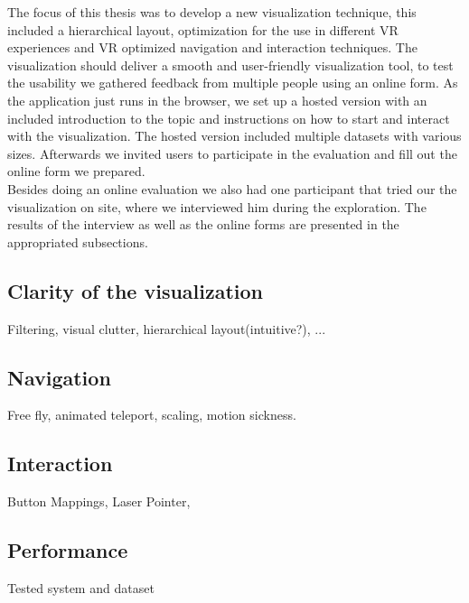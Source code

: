 The focus of this thesis was to develop a new visualization technique, this included a hierarchical layout, optimization for the use in different VR experiences and VR optimized navigation and interaction techniques.
The visualization should deliver a smooth and user-friendly visualization tool, to test the usability we gathered feedback from multiple people using an online form.
As the application just runs in the browser, we set up a hosted version \cite{thesisWebsite} with an included introduction to the topic and instructions on how to start and interact with the visualization. The hosted version included multiple datasets with various sizes. Afterwards we invited users to participate in the evaluation and fill out the online form we prepared.
\\
Besides doing an online evaluation we also had one participant that tried our the visualization on site, where we interviewed him during the exploration.
The results of the interview as well as the online forms are presented in the appropriated subsections.
\\
   
\subsection{Clarity of the visualization}
Filtering, visual clutter, hierarchical layout(intuitive?), ...

\subsection{Navigation}
Free fly, animated teleport, scaling, motion sickness.

\subsection{Interaction}
Button Mappings, Laser Pointer, 

\subsection{Performance}
Tested system and dataset